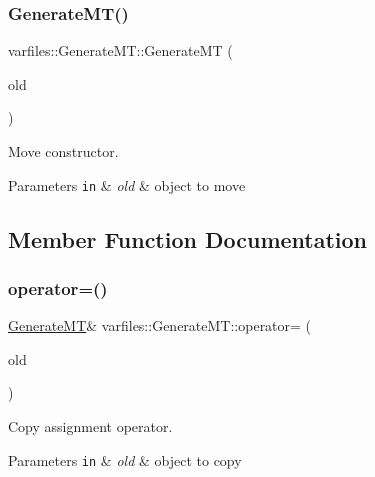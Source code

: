 \subsubsection{\texorpdfstring{Generate\+M\+T()}{GenerateMT()}\hspace{0.1cm}{\footnotesize\ttfamily [3/3]}}
{\footnotesize\ttfamily varfiles\+::\+Generate\+M\+T\+::\+Generate\+MT (\begin{DoxyParamCaption}\item[{\hyperlink{classvarfiles_1_1_generate_m_t}{Generate\+MT} \&\&}]{old }\end{DoxyParamCaption})\hspace{0.3cm}{\ttfamily [default]}}



Move constructor. 


\begin{DoxyParams}[1]{Parameters}
\mbox{\tt in}  & {\em old} & object to move \\
\hline
\end{DoxyParams}


\subsection{Member Function Documentation}
\mbox{\label{classvarfiles_1_1_generate_m_t_afe8f81d55be1fff8dc00c92d161c6ffb}} 
\subsubsection{\texorpdfstring{operator=()}{operator=()}\hspace{0.1cm}{\footnotesize\ttfamily [1/2]}}
{\footnotesize\ttfamily \hyperlink{classvarfiles_1_1_generate_m_t}{Generate\+MT}\& varfiles\+::\+Generate\+M\+T\+::operator= (\begin{DoxyParamCaption}\item[{const \hyperlink{classvarfiles_1_1_generate_m_t}{Generate\+MT} \&}]{old }\end{DoxyParamCaption})\hspace{0.3cm}{\ttfamily [default]}}



Copy assignment operator. 


\begin{DoxyParams}[1]{Parameters}
\mbox{\tt in}  & {\em old} & object to copy \\
\hline
\end{DoxyParams}
\mbox{\label{classvarfiles_1_1_generate_m_t_ab45dcefe5be9e5e794a9a4a2e94b3687}} 
